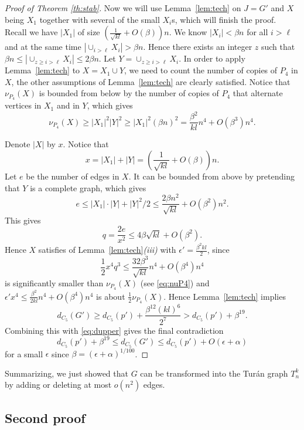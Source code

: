 \documentclass[12pt]{article}
\newcommand{\eps}{\epsilon}
\renewcommand{\a}{\alpha}
\renewcommand{\b}{\beta}
\theoremstyle{definition}
\theoremstyle{remark}
\renewcommand{\geq}{\geqslant}
\renewcommand{\leq}{\leqslant}
\renewcommand{\le}{\leqslant}
\begin{document}
\begin{proof}[Proof of Theorem \ref{th:stab}]

Now we will use Lemma~\ref{lem:tech}  on $J=G'$ and $X$ being $X_1$ together with several of the small $X_i$s, which will finish the proof.
Recall we have $|X_1|$ of size  $\left( \frac{1}{\sqrt{kl}} + O(\beta) \right)n$. 
We know $|X_i| < \beta n$ for all $i > \ell$ and at the same time $| \cup_{i > \ell} X_i | > \beta n$. 
Hence there exists an integer $z$ such that $\beta n \leq  | \cup_{z \geq i > \ell} X_i | \leq 2\beta n$. 
Let $Y = \cup_{z \geq i > \ell} X_i$. 
In order to apply Lemma~\ref{lem:tech} to $X=X_1 \cup Y$, we need to count the number of copies of $P_4$ in $X$,
the other assumptions of  Lemma~\ref{lem:tech} are clearly satisfied.
Notice that $\nu_{P_4}(X)$ is bounded from below by the number of copies of $P_4$ that alternate vertices in $X_1$ and in $Y$,
which gives
\begin{equation}\label{eq:nuP4}
\nu_{P_4}(X) \geq |X_1|^2 |Y|^2 \geq |X_1|^2 (\beta n)^2 = \frac{\beta^2}{kl} n^4 + O(\beta^3)n^4.
\end{equation}



Denote $|X|$ by $x$.
Notice that
\[
x = |X_1| + |Y| =  \left(\frac{1}{\sqrt{kl}} + O(\beta)\right) n.
\]
Let $e$ be the number of edges in $X$. It can be bounded from above by pretending that $Y$ is a complete graph,
which gives
\[
e \leq |X_1| \cdot |Y| + |Y|^2/2 \leq 	 \frac{2\beta n^2}{\sqrt{kl}} + O(\beta^2)n^2.
\]
This gives 
\[
q = \frac{2e}{x^2} \leq  4\beta \sqrt{kl} + O(\beta^2).
\]
Hence $X$ satisfies of Lemma~\ref{lem:tech}\textit{(iii)} with $\eps' = \frac{\beta^2kl}{2}$, since
\[
\frac{1}{2}x^4 q^3 \leq \frac{32\beta^3}{\sqrt{kl}}n^4 + O(\beta^4)n^4
\]
is significantly smaller than $\nu_{P_4}(X)$ (see \eqref{eq:nuP4}) and 
$\eps' x^4 \leq \frac{\beta^2}{2kl}n^4 + O(\beta^4)n^4$ is about $\frac12 \nu_{P_4}(X)$.
Hence Lemma~\ref{lem:tech} implies
\[
d_{C_5}(G') \geq  d_{C_5}(p') +  \frac{\beta^{12}(kl)^6}{2^7} >  d_{C_5}(p') + \beta^{19}. 
\]
Combining this with \eqref{eq:dupper} gives the final contradiction
\[
d_{C_5}(p') + \beta^{19}  \le d_{C_5}(G') \le d_{C_5}(p')+  O(\eps + \a)
\]
for a small $\eps$ since $\b =  (\eps+\a)^{1/100}$.
\end{proof}

Summarizing, we just showed that $G$ can be transformed into the Tur\'an graph $T_{n}^k$ by adding or deleting at most $o(n^2)$ edges.



\subsection{Second proof}
\end{document}
